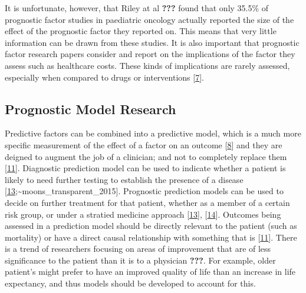 \documentclass[
]{article}
\begin{document}
It is unfortunate, however, that Riley at al {\textbf{???}} found that only 35.5\% of prognostic factor studies in paediatric oncology actually reported the size of the effect of the prognostic factor they reported on. This means that very little information can be drawn from these studies. It is also important that prognostic factor research papers consider and report on the implications of the factor they assess such as healthcare costs. These kinds of implications are rarely assessed, especially when compared to drugs or interventions {[}\protect\hyperlink{ref-riley_prognosis_2013}{7}{]}.

\hypertarget{prognostic-model-research}{%
\subsection{Prognostic Model Research}\label{prognostic-model-research}}

Predictive factors can be combined into a predictive model, which is a much more specific measurement of the effect of a factor on an outcome {[}\protect\hyperlink{ref-steyerberg_prognosis_2013}{8}{]} and they are deigned to augment the job of a clinician; and not to completely replace them {[}\protect\hyperlink{ref-moons_prognosis_2009}{11}{]}. Diagnostic prediction model can be used to indicate whether a patient is likely to need further testing to establish the presence of a disease {[}\protect\hyperlink{ref-collins_transparent_2015}{13};\textasciitilde moons\_transparent\_2015{]}. Prognostic prediction models can be used to decide on further treatment for that patient, whether as a member of a certain risk group, or under a stratied medicine approach {[}\protect\hyperlink{ref-collins_transparent_2015}{13}{]}, {[}\protect\hyperlink{ref-moons_transparent_2015}{14}{]}. Outcomes being assessed in a prediction model should be directly relevant to the patient (such as mortality) or have a direct causal relationship with something that is {[}\protect\hyperlink{ref-moons_prognosis_2009}{11}{]}. There is a trend of researchers focusing on areas of improvement that are of less significance to the patient than it is to a physician {\textbf{???}}. For example, older patient's might prefer to have an improved quality of life than an increase in life expectancy, and thus models should be developed to account for this.
\end{document}
